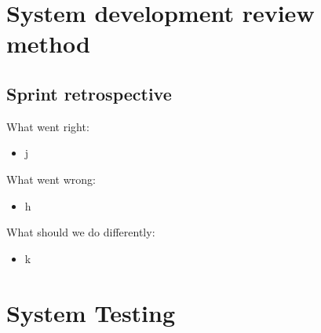\documentclass[11 pt]{article}
\begin{document}
\section{System development review method} 
\subsection{Sprint retrospective}
What went right:
\begin{itemize}
\item j

\end{itemize}
What went wrong:
\begin{itemize}
\item h

\end{itemize}
What should we do differently:
\begin{itemize}
\item k
\end{itemize}
\section{System Testing}
\end{document}
